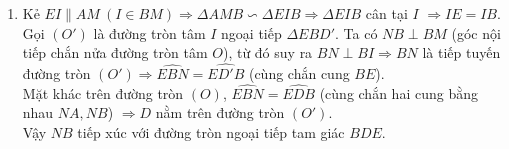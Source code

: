 \begin{ex}
{\begin{enumerate}[1)]
Xét các tam giác $\Delta NBE$ và $\Delta NDB$ có góc $N$ chung, $\widehat{NBE}=\widehat{NDB}$ (cùng chắn hai cung bằng nhau là cung $NA, NB$).\\
Suy ra $\Delta NBE\backsim \Delta NDB$, do đó $\dfrac{NB}{ND}=\dfrac{NE}{NB}\Rightarrow NB^2=NE.ND$.\\
Ta có cung $NA$ bằng cung $NB$ (tính chất đường kính và dây cung), suy ra $\widehat{ADE}=\widehat{EDB} \Rightarrow DE$ là phân giác trong của $\Delta ABD$.\\
Vì $ED\perp DC \Rightarrow DC$ là phân giác ngoài của $\Delta ABD$.\\
Từ đó suy ra: $\dfrac{DA}{DB}=\dfrac{EA}{EB}=\dfrac{CA}{CB}\Rightarrow AC.BE=BC.AE$.
    \item Kẻ $EI \| AM \ (I\in BM) \Rightarrow \Delta AMB \backsim \Delta EIB \Rightarrow \Delta EIB$ cân tại $I$ $\Rightarrow IE = IB$.\\
Gọi $(O')$ là đường tròn tâm $I$ ngoại tiếp $\Delta EBD'$. Ta có $NB\perp BM$ (góc nội tiếp chắn nửa đường tròn tâm $O$), từ đó suy ra $BN\perp BI \Rightarrow BN$ là tiếp tuyến đường tròn $(O') \Rightarrow\widehat{EBN}=\widehat{ED'B}$ (cùng chắn cung $BE$).\\
Mặt khác trên đường tròn $(O)$, $\widehat{EBN}=\widehat{EDB}$ (cùng chắn hai cung bằng nhau $NA, NB$) $\Rightarrow D$ nằm trên đường tròn $(O')$.\\
Vậy $NB$ tiếp xúc với đường tròn ngoại tiếp tam giác $BDE$.
\end{enumerate}
}
\end{ex}


